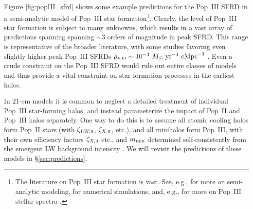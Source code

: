 Figure \ref{fig:popIII_sfrd} shows some example predictions for the Pop~III SFRD in a semi-analytic model of Pop~III star formation\footnote{The literature on Pop~III star formation is vast. See, e.g., \cite{Trenti2009,Crosby2013,Visbal2018,Mebane2018,Jaacks2018,Sarmento2018} for more on semi-analytic modeling, \cite{Abel,Bromm1999,Turk,OShea,Yoshida} for numerical simulations, and, e.g., \cite{Tumlinson2000,Bromm2001,Schaerer2002} for more on Pop~III stellar spectra .}. Clearly, the level of Pop~III star formation is subject to many unknowns, which results in a vast array of predictions spanning spanning $\sim 3$ orders of magnitude in peak SFRD. This range is representative of the broader literature, with some studies favoring even slightly higher peak Pop~III SFRDs $\dot{\rho}_{\ast,\textsc{iii}} \sim 10^{-3} \ M_{\odot} \ \text{yr}^{-1} \ \text{cMpc}^{-3}$ \cite{Sarmento2008}. Even a crude constraint on the Pop~III SFRD would rule out entire classes of models and thus provide a vital constraint on star formation processes in the earliest halos.

In 21-cm models it is common to neglect a detailed treatment of individual Pop~III star-forming halos, and instead parameterize the impact of Pop~II and Pop~III halos separately. One way to do this is to assume all atomic cooling halos form Pop~II stars (with $\zeta_{LW,\textsc{ii}}$, $\zeta_{X,\textsc{ii}}$, etc.), and all minihalos form Pop~III, with their own efficiency factors $\zeta_{X,\textsc{ii}}$ etc., and $m_{\text{min}}$ determined self-consistently from the emergent LW background intensity \cite{Fialkov2014a,Mirocha2018}. We will revisit the predictions of these models in \S\ref{sec:predictions}.

